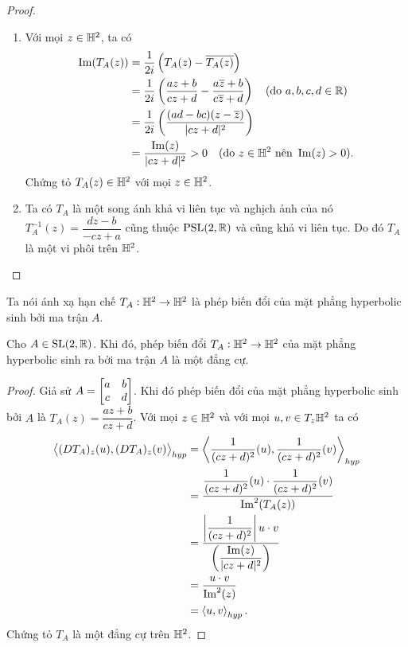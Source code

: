 \begin{proof}
    \begin{enumerate}
        \item Với mọi $z\in \mathbb{H}^2$, ta có 
            \begin{align*}
            \operatorname{Im}(T_A(z)) &= \dfrac{1}{2i}\left(T_A(z) - \overline{T_A(z)}\right)\\
            &= \dfrac{1}{2i}\left(\dfrac{az+b}{cz+d} - \dfrac{a\overline{z}+b}{c\overline{z}+d}\right) \quad (\text{do } a,b,c,d \in \mathbb{R})\\
            &= \dfrac{1}{2i}\left(\dfrac{(ad-bc)(z-\overline{z})}{|cz+d|^2}\right)\\
            &= \dfrac{\operatorname{Im}(z)}{|cz+d|^2} > 0\quad(\text{do } z \in \mathbb{H}^2 \text{ nên } \operatorname{Im}(z) >0).
            \end{align*}
            Chứng tỏ $T_A(z) \in \mathbb{H}^2$ với mọi $z\in \mathbb{H}^2$.

            \item Ta có $T_A$ là một song ánh khả vi liên tục và nghịch ảnh của nó $T_A^{-1}(z) = \dfrac{dz-b}{-cz+a}$ cũng thuộc $\operatorname{PSL}(2,\mathbb{R})$ và cũng khả vi liên tục. Do đó $T_A$ là một vi phôi trên $\mathbb{H}^2$.
    \end{enumerate}
\end{proof}

Ta nói ánh xạ hạn chế $T_A: \mathbb{H}^2 \to \mathbb{H}^2$ là phép biến đổi của mặt phẳng hyperbolic sinh bởi ma trận $A$.
\begin{prop}\label{prop 2.2.12}
    Cho $A\in \operatorname{SL}(2,\mathbb{R})$. Khi đó, phép biến đổi $T_A:\mathbb{H}^2 \to \mathbb{H}^2$ của mặt phẳng hyperbolic sinh ra bởi ma trận $A$ là một đẳng cự.
\end{prop}
\begin{proof}
    Giả sử $A = \begin{bmatrix} a & b \\ c & d \\ \end{bmatrix}$.  Khi đó phép biến đổi của mặt phẳng hyperbolic sinh bởi $A$ là $T_A(z) = \dfrac{az+b}{cz+d}$. Với mọi $z\in \mathbb{H}^2$ và với mọi $u,v \in T_z\mathbb{H}^2$ ta có
    \begin{align*}
        \left<(DT_A)_z(u),(DT_A)_z(v)\right>_{hyp} 
        &= \left<\dfrac{1}{(cz+d)^2}(u),\dfrac{1}{(cz+d)^2}(v)\right>_{hyp} \\
        & = \dfrac{\dfrac{1}{(cz+d)^2}(u) \cdot \dfrac{1}{(cz+d)^2}(v)}{\operatorname{Im}^2(T_A(z))}\\
        &= \dfrac{\left|\dfrac{1}{(cz+d)^2}\right|u\cdot v}{\left(\dfrac{\operatorname{Im}(z)}{|cz+d|^2}\right)}\\
        &= \dfrac{u\cdot v}{\operatorname{Im}^2(z)}\\
        &= \left<u,v\right>_{hyp}.
    \end{align*}
    Chứng tỏ $T_A$ là một đẳng cự trên $\mathbb{H}^2$.
\end{proof}


